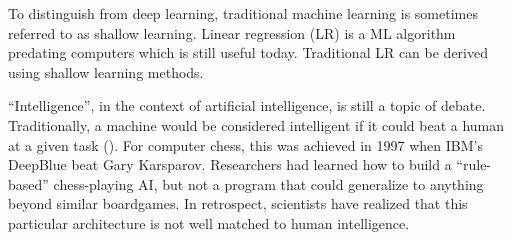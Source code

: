To distinguish from deep learning, traditional machine learning is sometimes referred to as shallow learning. Linear regression (LR) is a ML algorithm predating computers which is still useful today. Traditional LR can be derived using shallow learning methods. 

``Intelligence'', in the context of artificial intelligence, is still a topic of debate. Traditionally, a machine would be considered intelligent if it could beat a human at a given task (\cite{Chollet2019OnIntelligence}). For computer chess, this was achieved in 1997 when IBM's DeepBlue beat Gary Karsparov. Researchers had learned how to build a ``rule-based'' chess-playing AI, but not a program that could generalize to anything beyond similar boardgames. In retrospect, scientists have realized that this particular architecture is not well matched to human intelligence. 





